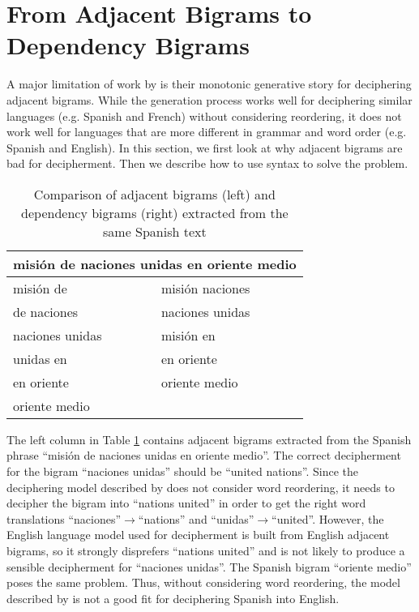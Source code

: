 \section{From Adjacent Bigrams to Dependency Bigrams}
\label{adj2dep}
A major limitation of work by  is their monotonic generative story for deciphering adjacent bigrams. While the generation process works well for deciphering similar languages (e.g. Spanish and French) without considering reordering, it does not work well for languages that are more different in grammar and word order (e.g. Spanish and English). In this section, we first look at why adjacent bigrams are bad for decipherment. Then we describe how to use syntax to solve the problem.


 \begin{table}
 \begin{center}
 \begin{tabular}{ |p{3.4cm}|p{3.4cm}| }
 \hline
  \multicolumn{2}{|c|}{misi\'{o}n de naciones unidas en oriente medio} \\ \hline
  misi\'{o}n  de & misi\'{o}n naciones \\
  de naciones & naciones unidas \\
  naciones  unidas & misi\'{o}n en \\
  unidas  en & en oriente \\
  en  oriente & oriente  medio \\
  oriente  medio & \\ \hline
 \end{tabular}
  \caption{Comparison of adjacent bigrams (left) and dependency bigrams (right) extracted from the same Spanish text}
   \label{txt2bigrams}
\end{center}
 \end{table}

The left column in Table \ref{txt2bigrams} contains adjacent bigrams extracted from the Spanish phrase ``misi\'{o}n de naciones unidas en oriente medio''. The correct decipherment for the bigram ``naciones unidas'' should be ``united nations''. Since the deciphering model described by  does not consider word reordering, it needs to decipher the bigram into ``nations united'' in order to get the right word translations ``naciones''$\rightarrow$``nations'' and ``unidas''$\rightarrow$``united''. However, the English language model used for decipherment is built from English adjacent bigrams, so it strongly disprefers ``nations united'' and is not likely to produce a sensible decipherment for ``naciones unidas''. The Spanish bigram ``oriente medio''  poses the same problem. Thus, without considering word reordering, the model described by  is not a good fit for deciphering Spanish into English.

